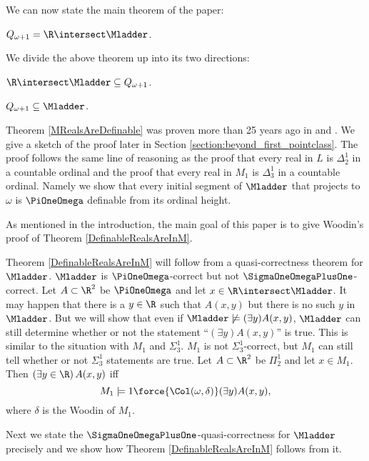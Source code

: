 \documentclass[oneside,12pt]{amsart}
\begin{document}
We can now state the main theorem of the paper:

\begin{theorem}
$Q_{\omega+1} = \R \intersect \Mladder$.
\end{theorem}

We divide the above theorem up into its two directions:

\begin{theorem}
\label{MRealsAreDefinable}
$\R \intersect \Mladder \subseteq Q_{\omega+1}$.
\end{theorem}

\begin{theorem}
\label{DefinableRealsAreInM}
$Q_{\omega+1} \subseteq \Mladder$.
\end{theorem}

Theorem \ref{MRealsAreDefinable} was proven more than 25 years ago in
\cite{My_Thesis} and \cite{Mouse_Sets}. We give a sketch of the proof later
in Section \ref{section:beyond_first_pointclass}. The proof follows the same
line of reasoning as the proof that every real in $L$ is $\Delta^1_2$ in a
countable ordinal and the proof that every real in $M_1$ is $\Delta^1_3$ in
a countable ordinal. Namely we show that every initial segment of $\Mladder$
that projects to $\omega$ is $\PiOneOmega$ definable from its ordinal height.

As mentioned in the introduction, the main goal of this paper is to give Woodin's proof of Theorem \ref{DefinableRealsAreInM}.

Theorem \ref{DefinableRealsAreInM} will follow from a quasi-correctness theorem
for $\Mladder$. $\Mladder$ is $\PiOneOmega$-correct but not $\SigmaOneOmegaPlusOne$-correct.
Let $A\subset\R^2$ be $\PiOneOmega$ and let $x\in\R\intersect\Mladder$. It may
happen that there is a $y\in \R$ such that $A(x,y)$ but there is no such $y$
in $\Mladder$. But we will show that even if $\Mladder\not\models(\exists y) A(x,y)$,
$\Mladder$ can still determine whether or not the statement
``$(\exists y) A(x,y)$'' is true. This is similar to the situation with $M_1$ and
$\Sigma^1_3$. $M_1$ is not $\Sigma^1_3$-correct, but $M_1$ can still tell whether
or not $\Sigma^1_3$ statements are true. Let $A\subset\R^2$ be $\Pi^1_2$ and
let $x\in M_1$. Then $(\exists y\in\R)\, A(x,y)$ iff
$$M_1\models 1\force{\Col(\omega,\delta)} (\exists y) A(x,y),$$
where $\delta$ is the Woodin of $M_1$.

Next we state the
$\SigmaOneOmegaPlusOne$-quasi-correctness for $\Mladder$ precisely and
we show how
Theorem \ref{DefinableRealsAreInM} follows from it.
\end{document}
